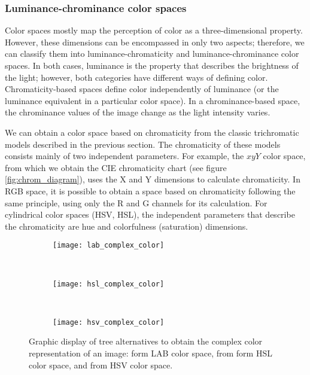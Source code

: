 \subsubsection{Luminance-chrominance color spaces}%

Color spaces mostly map the perception of color as a three-dimensional property. However, these dimensions can be encompassed in only two aspects; therefore, we can classify them into luminance-chromaticity and luminance-chrominance color spaces. In both cases, luminance is the property that describes the brightness of the light; however, both categories have different ways of defining color. Chromaticity-based spaces define color independently of luminance (or the luminance equivalent in a particular color space). In a chrominance-based space, the chrominance values of the image change as the light intensity varies.
  
We can obtain a color space based on chromaticity from the classic trichromatic models described in the previous section. The chromaticity of these models consists mainly of two independent parameters. For example, the $xyY$ color space, from which we obtain the CIE chromaticity chart (see figure \ref{fig:chrom_diagram}), uses the X and Y dimensions to calculate chromaticity. In RGB space, it is possible to obtain a space based on chromaticity following the same principle, using only the R and G channels for its calculation. For cylindrical color spaces (HSV, HSL), the independent parameters that describe the chromaticity are hue and colorfulness (saturation) dimensions.

\begin{figure}[!ht] 
	\centering
	\begin{subfigure}[b]{0.48\textwidth}
		\centering
		\texttt{[image: lab\_complex\_color]}
		\caption{}	
		\label{fig:lab_complex_color}
	\end{subfigure}
	~%
	\begin{subfigure}[b]{0.48\textwidth}
		\centering
		\texttt{[image: hsl\_complex\_color]}
		\caption{}	
		\label{fig:hsl_complex_color}
	\end{subfigure}
	~%
	\begin{subfigure}[b]{0.48\textwidth}
		\centering
		\texttt{[image: hsv\_complex\_color]}
		\caption{ }	
		\label{fig:hsv_complex_color}
	\end{subfigure}
	
	\caption{Graphic display of tree alternatives to obtain the complex color representation of an image:  form LAB color space,  from form HSL color space, and  from HSV color space.}
	\label{fig:complex_color_spaces}
\end{figure}

